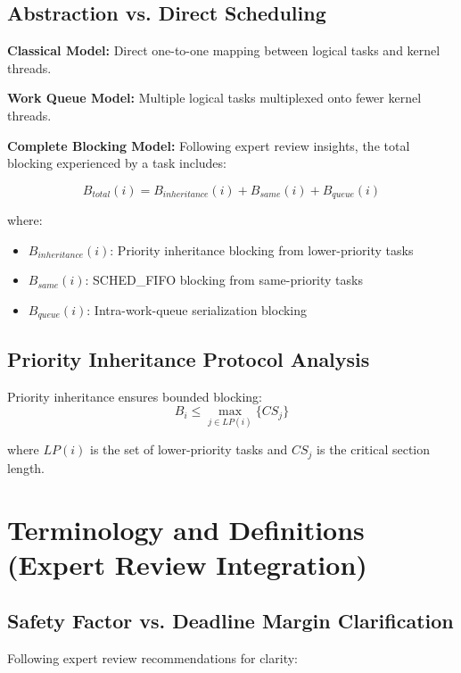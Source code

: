 \documentclass[12pt,a4paper]{article}
\begin{document}
\subsection{Abstraction vs. Direct Scheduling}

\textbf{Classical Model:} Direct one-to-one mapping between logical tasks and kernel threads.

\textbf{Work Queue Model:} Multiple logical tasks multiplexed onto fewer kernel threads.

\textbf{Complete Blocking Model:} Following expert review insights, the total blocking experienced by a task includes:

\begin{equation}
B_{total}(i) = B_{inheritance}(i) + B_{same}(i) + B_{queue}(i)
\end{equation}

where:
\begin{itemize}
\item $B_{inheritance}(i)$: Priority inheritance blocking from lower-priority tasks
\item $B_{same}(i)$: SCHED\_FIFO blocking from same-priority tasks
\item $B_{queue}(i)$: Intra-work-queue serialization blocking
\end{itemize}

\subsection{Priority Inheritance Protocol Analysis}

Priority inheritance ensures bounded blocking:
\begin{equation}
B_i \leq \max_{j \in LP(i)} \{CS_j\}
\end{equation}

where $LP(i)$ is the set of lower-priority tasks and $CS_j$ is the critical section length.

\section{Terminology and Definitions (Expert Review Integration)}

\subsection{Safety Factor vs. Deadline Margin Clarification}

Following expert review recommendations for clarity:
\end{document}
